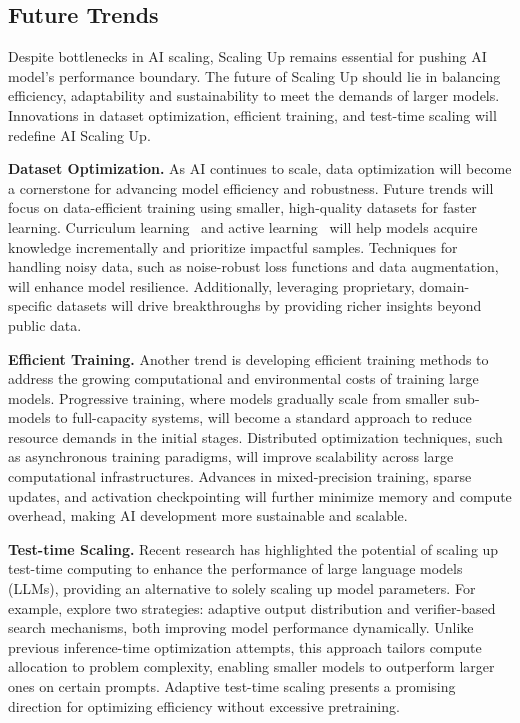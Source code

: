 \subsection{Future Trends}
Despite bottlenecks in AI scaling, Scaling Up remains essential for pushing AI model's performance boundary. The future of Scaling Up should lie in balancing efficiency, adaptability and sustainability to meet the demands of larger models. Innovations in dataset optimization, efficient training, and test-time scaling will redefine AI Scaling Up.

\textbf{Dataset Optimization.}
As AI continues to scale, data optimization will become a cornerstone for advancing model efficiency and robustness. Future trends will focus on data-efficient training using smaller, high-quality datasets for faster learning. Curriculum learning~\cite{bengio2009curriculum} and active learning~\cite{settles2009active} will help models acquire knowledge incrementally and prioritize impactful samples. Techniques for handling noisy data, such as noise-robust loss functions and data augmentation, will enhance model resilience. Additionally, leveraging proprietary, domain-specific datasets will drive breakthroughs by providing richer insights beyond public data.
 
\textbf{Efficient Training.}
Another trend is developing efficient training methods to address the growing computational and environmental costs of training large models. Progressive training, where models gradually scale from smaller sub-models to full-capacity systems, will become a standard approach to reduce resource demands in the initial stages. Distributed optimization techniques, such as asynchronous training paradigms, will improve scalability across large computational infrastructures. Advances in mixed-precision training, sparse updates, and activation checkpointing will further minimize memory and compute overhead, making AI development more sustainable and scalable. 
    
\textbf{Test-time Scaling.}
Recent research has highlighted the potential of scaling up test-time computing to enhance the performance of large language models (LLMs), providing an alternative to solely scaling up model parameters. For example,  
\citet{snell2024scaling} explore two strategies: adaptive output distribution and verifier-based search mechanisms, both improving model performance dynamically. Unlike previous inference-time optimization attempts, this approach tailors compute allocation to problem complexity, enabling smaller models to outperform larger ones on certain prompts. Adaptive test-time scaling presents a promising direction for optimizing efficiency without excessive pretraining.
